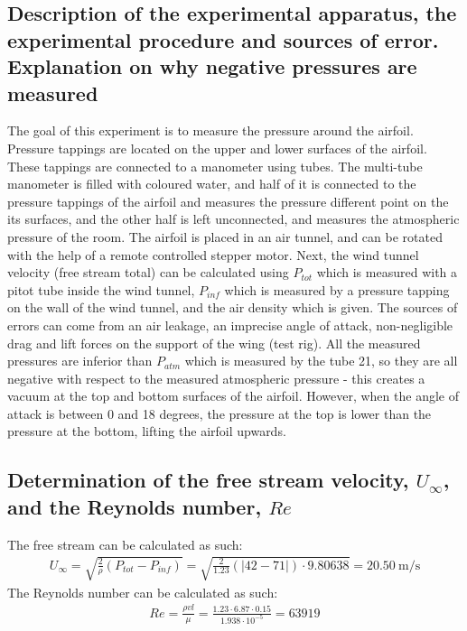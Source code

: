 \documentclass[11pt]{article}
\begin{document}
\subsection*{Description of the experimental apparatus, the experimental procedure and sources of error. Explanation on why negative pressures are measured}
The goal of this experiment is to measure the pressure around the airfoil. Pressure tappings are located on the upper and lower surfaces of the airfoil. These tappings are connected to a manometer using tubes. The multi-tube manometer is filled with coloured water, and half of it is connected to the pressure tappings of the airfoil and measures the pressure different point on the its surfaces, and the other half is left unconnected, and measures the atmospheric pressure of the room. The airfoil is placed in an air tunnel, and can be rotated with the help of a remote controlled stepper motor. Next, the wind tunnel velocity (free stream total) can be calculated using $P_{tot}$ which is measured with a pitot tube inside the wind tunnel, $P_{inf}$ which is measured by a pressure tapping on the wall of the wind tunnel, and the air density which is given. The sources of errors can come from an air leakage, an imprecise angle of attack, non-negligible drag and lift forces on the support of the wing (test rig). All the measured pressures are inferior than $P_{atm}$ which is measured by the tube 21, so they are all negative with respect to the measured atmospheric pressure - this creates a vacuum at the top and bottom surfaces of the airfoil. However, when the angle of attack is between 0 and 18 degrees, the pressure at the top is lower than the pressure at the bottom, lifting the airfoil upwards.
\subsection*{Determination of the free stream velocity, $U_{\infty}$, and the Reynolds number, $Re$}
The free stream can be calculated as such:
\begin{align}
  U_{\infty} = \sqrt{\frac{2}{\rho}\left(P_{tot} - P_{inf}\right)} = \sqrt{\frac{2}{1.23}\left( \left| 42-71 \right| \right) \cdot 9.80638} = \SI{20.50}{\meter\per\second}
\end{align}
The Reynolds number can be calculated as such:
\begin{align}
  Re = \frac{\rho v l}{\mu} = \frac{1.23 \cdot 6.87 \cdot 0.15}{1.938\cdot 10^{-5}} = 63919
\end{align}
\end{document}
